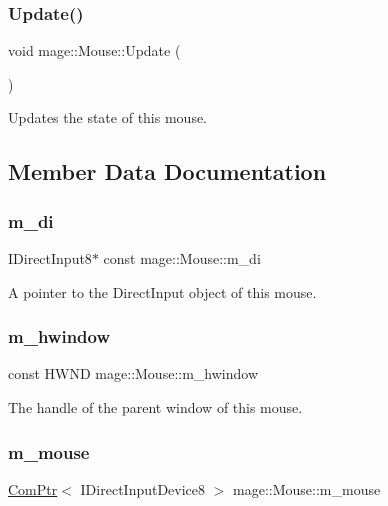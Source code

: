 \subsubsection{\texorpdfstring{Update()}{Update()}}
{\footnotesize\ttfamily void mage\+::\+Mouse\+::\+Update (\begin{DoxyParamCaption}{ }\end{DoxyParamCaption})}

Updates the state of this mouse. 

\subsection{Member Data Documentation}
\hypertarget{classmage_1_1_mouse_a892a9e1d5ad16ac9b67a5f69fbfedeab}{}\label{classmage_1_1_mouse_a892a9e1d5ad16ac9b67a5f69fbfedeab} 
\subsubsection{\texorpdfstring{m\+\_\+di}{m\_di}}
{\footnotesize\ttfamily I\+Direct\+Input8$\ast$ const mage\+::\+Mouse\+::m\+\_\+di\hspace{0.3cm}{\ttfamily [private]}}

A pointer to the Direct\+Input object of this mouse. \hypertarget{classmage_1_1_mouse_a51592b367595f8ed772266104fc813c5}{}\label{classmage_1_1_mouse_a51592b367595f8ed772266104fc813c5} 
\subsubsection{\texorpdfstring{m\+\_\+hwindow}{m\_hwindow}}
{\footnotesize\ttfamily const H\+W\+ND mage\+::\+Mouse\+::m\+\_\+hwindow\hspace{0.3cm}{\ttfamily [private]}}

The handle of the parent window of this mouse. \hypertarget{classmage_1_1_mouse_a3f2803f3c0e008f5d764a11de3dbe098}{}\label{classmage_1_1_mouse_a3f2803f3c0e008f5d764a11de3dbe098} 
\subsubsection{\texorpdfstring{m\+\_\+mouse}{m\_mouse}}
{\footnotesize\ttfamily \hyperlink{namespacemage_ae74f374780900893caa5555d1031fd79}{Com\+Ptr}$<$ I\+Direct\+Input\+Device8 $>$ mage\+::\+Mouse\+::m\+\_\+mouse\hspace{0.3cm}{\ttfamily [private]}}

